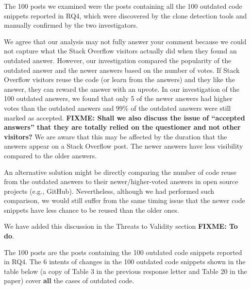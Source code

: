 \documentclass[a4paper,twoside,10pt]{reviewresponse}
\newcommand\FIXME[1]{{\color{red}\textbf{FIXME: #1}}}
\begin{document}
The 100 posts we examined were the posts containing all the 100 outdated code snippets reported in RQ4, which were discovered by the clone detection tools and manually confirmed by the two investigators.


We agree that our analysis may not fully answer your comment because we could not capture what the Stack Overflow visitors actually did when they found an outdated answer. However, our investigation compared the popularity of the outdated answer and the newer answers based on the number of votes. If Stack Overflow visitors reuse the code (or learn from the answers) and they like the answer, they can reward the answer with an upvote. In our investigation of the 100 outdated answers, we found that only 5 of the newer answers had higher votes than the outdated answers and 99\% of the outdated answers were still marked as accepted. \FIXME{Shall we also discuss the issue of ``accepted answers'' that they are totally relied on the questioner and not other visitors?} We are aware that this may be affected by the duration that the answers appear on a Stack Overflow post. The newer answers have less visibility compared to the older answers. 

An alternative solution might be directly comparing the number of code reuse from the outdated answers to their newer/higher-voted answers in open source projects (e.g., GitHub). 
Nevertheless, although we had performed such comparison, we would still suffer from the same timing issue that the newer code snippets have less chance to be reused than the older ones.

We have added this discussion in the Threats to Validity section \FIXME{To do}.


The 100 posts are the posts containing the 100 outdated code snippets reported in RQ4. The 6 intents of changes in the 100 outdated code snippets shown in the table below (a copy of Table 3 in the previous response letter and Table 20 in the paper) cover \textbf{all} the cases of outdated code. 
\end{document}
